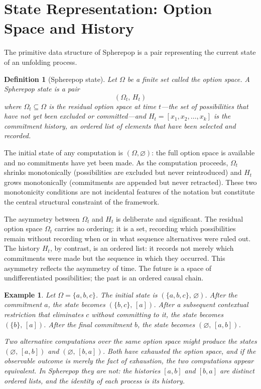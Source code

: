 \documentclass[12pt]{article}
\newtheorem{definition}{Definition}[section]
\newtheorem{example}{Example}[section]
\begin{document}
\section{State Representation: Option Space and History}
\label{sec:state}

The primitive data structure of Spherepop is a pair representing the current state of an unfolding process.

\begin{definition}[Spherepop state]
\label{def:state}
Let $\Omega$ be a finite set called the \emph{option space}. A \emph{Spherepop state} is a pair
\[
(\Omega_t,\, H_t)
\]
where $\Omega_t \subseteq \Omega$ is the \emph{residual option space} at time $t$---the set of possibilities that have not yet been excluded or committed---and $H_t = [x_1, x_2, \ldots, x_k]$ is the \emph{commitment history}, an ordered list of elements that have been selected and recorded.
\end{definition}

The initial state of any computation is $(\Omega, \varnothing)$: the full option space is available and no commitments have yet been made. As the computation proceeds, $\Omega_t$ shrinks monotonically (possibilities are excluded but never reintroduced) and $H_t$ grows monotonically (commitments are appended but never retracted). These two monotonicity conditions are not incidental features of the notation but constitute the central structural constraint of the framework.

The asymmetry between $\Omega_t$ and $H_t$ is deliberate and significant. The residual option space $\Omega_t$ carries no ordering: it is a set, recording which possibilities remain without recording when or in what sequence alternatives were ruled out. The history $H_t$, by contrast, is an ordered list: it records not merely which commitments were made but the sequence in which they occurred. This asymmetry reflects the asymmetry of time. The future is a space of undifferentiated possibilities; the past is an ordered causal chain.

\begin{example}
Let $\Omega = \{a, b, c\}$. The initial state is $(\{a,b,c\},\, \varnothing)$. After the commitment $a$, the state becomes $(\{b,c\},\, [a])$. After a subsequent contextual restriction that eliminates $c$ without committing to it, the state becomes $(\{b\},\, [a])$. After the final commitment $b$, the state becomes $(\varnothing,\, [a,b])$.

Two alternative computations over the same option space might produce the states $(\varnothing,\, [a,b])$ and $(\varnothing,\, [b,a])$. Both have exhausted the option space, and if the observable outcome is merely the fact of exhaustion, the two computations appear equivalent. In Spherepop they are not: the histories $[a,b]$ and $[b,a]$ are distinct ordered lists, and the identity of each process is its history.
\end{example}
\end{document}
